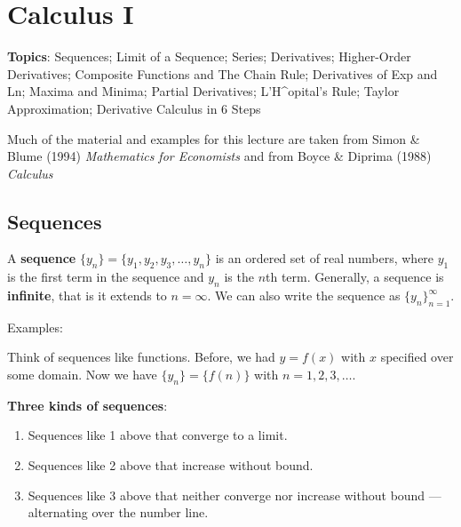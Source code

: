 \documentclass[]{book}
\providecommand{\tightlist}{%
  \setlength{\itemsep}{0pt}\setlength{\parskip}{0pt}}
\theoremstyle{definition}
\theoremstyle{definition}
\theoremstyle{definition}
\theoremstyle{remark}
\begin{document}
\chapter{Calculus I}\label{derivatives}

\textbf{Topics}: Sequences; Limit of a Sequence; Series; Derivatives;
Higher-Order Derivatives; Composite Functions and The Chain Rule;
Derivatives of Exp and Ln; Maxima and Minima; Partial Derivatives;
L'H\^{}opital's Rule; Taylor Approximation; Derivative Calculus in 6
Steps

Much of the material and examples for this lecture are taken from Simon
\& Blume (1994) \emph{Mathematics for Economists} and from Boyce \&
Diprima (1988) \emph{Calculus}

\section{Sequences}\label{sequences}

A \textbf{sequence} \(\{y_n\}=\{y_1, y_2, y_3, \ldots, y_n\}\) is an
ordered set of real numbers, where \(y_1\) is the first term in the
sequence and \(y_n\) is the \(n\)th term. Generally, a sequence is
\textbf{infinite}, that is it extends to \(n=\infty\). We can also write
the sequence as \(\{y_n\}^\infty_{n=1}\).

Examples:

\begin{comment}
    \begin{enumerate}
        \item \parbox[t]{3in}{$\{y_n\}=\left\{ 2-\frac{1}{n^2} \right\} = $}\parbox[t]{1in}{\, {\texttt{[image: limit.eps]}}}
        \item \parbox[t]{3in}{$\{y_n\}=\left\{ \frac{n^2+1}{n} \right\} = $}\parbox[t]{1in}{\,  {\texttt{[image: unbound.eps]}}}
        \item \parbox[t]{3in}{$\{y_n\}=\left\{ (-1)^n \left(1-\frac{1}{n}\right) \right\} = $}\parbox[t]{1in}{\,  {\texttt{[image: altrnate.eps]}}}
    \end{enumerate}
\end{comment}

Think of sequences like functions. Before, we had \(y=f(x)\) with \(x\)
specified over some domain. Now we have \(\{y_n\}=\{f(n)\}\) with
\(n=1,2,3,\ldots\).

\textbf{Three kinds of sequences}:

\begin{enumerate}
\def\labelenumi{\arabic{enumi}.}
\tightlist
\item
  Sequences like 1 above that converge to a limit.
\item
  Sequences like 2 above that increase without bound.
\item
  Sequences like 3 above that neither converge nor increase without
  bound --- alternating over the number line.
\end{enumerate}
\end{document}
